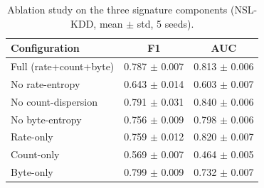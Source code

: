 \begin{table}[t]
\centering
\caption{Ablation study on the three signature components (NSL-KDD, mean $\pm$ std, 5 seeds).}
\label{tab:ablation}
\begin{tabular}{lcc}
\toprule
Configuration & F1 & AUC \\
\midrule
Full (rate+count+byte) & 0.787 $\pm$ 0.007 & 0.813 $\pm$ 0.006 \\
No rate-entropy & 0.643 $\pm$ 0.014 & 0.603 $\pm$ 0.007 \\
No count-dispersion & 0.791 $\pm$ 0.031 & 0.840 $\pm$ 0.006 \\
No byte-entropy & 0.756 $\pm$ 0.009 & 0.798 $\pm$ 0.006 \\
Rate-only & 0.759 $\pm$ 0.012 & 0.820 $\pm$ 0.007 \\
Count-only & 0.569 $\pm$ 0.007 & 0.464 $\pm$ 0.005 \\
Byte-only & 0.799 $\pm$ 0.009 & 0.732 $\pm$ 0.007 \\
\bottomrule
\end{tabular}
\end{table}
